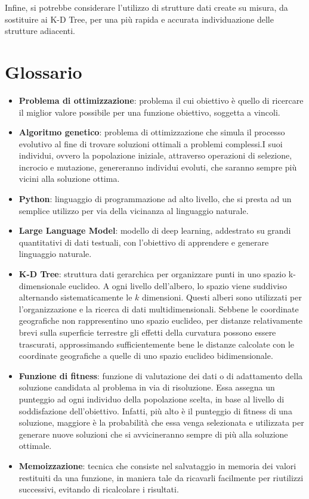 \documentclass{CSUniSchoolLabReport}
\begin{document}
Infine, si potrebbe considerare l'utilizzo di strutture dati create su misura, da sostituire ai K-D Tree, per una più rapida e accurata individuazione delle strutture adiacenti.

\pagebreak{}
\section{Glossario}

\begin{itemize}
   \item \textbf{Problema di ottimizzazione}: problema il cui obiettivo è quello di ricercare il miglior valore possibile per una funzione obiettivo, soggetta a vincoli.
   \item \textbf{Algoritmo genetico}: problema di ottimizzazione che simula il processo evolutivo al fine di trovare soluzioni ottimali a problemi complessi.I suoi individui, ovvero la popolazione iniziale, attraverso operazioni di selezione, incrocio e mutazione, genereranno individui evoluti, che saranno sempre più vicini alla soluzione ottima.
   \item \textbf{Python}: linguaggio di programmazione ad alto livello, che si presta ad un semplice utilizzo per via della vicinanza al linguaggio naturale.
   \item \textbf{Large Language Model}: modello di deep learning, addestrato su grandi quantitativi di dati testuali, con l'obiettivo di apprendere e generare linguaggio naturale.
   \item \textbf{K-D Tree}: struttura dati gerarchica per organizzare punti in uno spazio k-dimensionale euclideo. A ogni livello dell'albero, lo spazio viene suddiviso alternando sistematicamente le $k$ dimensioni. Questi alberi sono utilizzati per l'organizzazione e la ricerca di dati multidimensionali. Sebbene le coordinate geografiche non rappresentino uno spazio euclideo, per distanze relativamente brevi sulla superficie terrestre gli effetti della curvatura possono essere trascurati, approssimando sufficientemente bene le distanze calcolate con le coordinate geografiche a quelle di uno spazio euclideo bidimensionale.
   \item \textbf{Funzione di fitness}: funzione di valutazione dei dati o di adattamento della soluzione candidata al problema in via di risoluzione. Essa assegna un punteggio ad ogni individuo della popolazione scelta, in base al livello di soddisfazione dell'obiettivo. Infatti, più alto è il punteggio di fitness di una soluzione, maggiore è la probabilità che essa venga selezionata e utilizzata per generare nuove soluzioni che si avvicineranno sempre di più alla soluzione ottimale.
   \item \textbf{Memoizzazione}: tecnica che consiste nel salvataggio in memoria dei valori restituiti da una funzione, in maniera tale da ricavarli facilmente per riutilizzi successivi, evitando di ricalcolare i risultati. 
\end{itemize}
\end{document}
